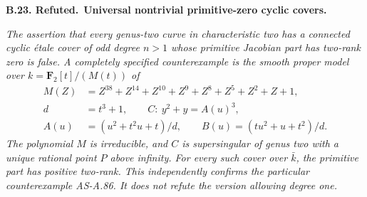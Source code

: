 \documentclass[11pt,a4paper]{article}
\newenvironment{claim}[3]{\par\medskip\noindent\hypertarget{#1}{\textbf{#1. #2.}}\ \textbf{#3.}\par\nopagebreak\smallskip\begingroup\itshape}{\endgroup\par\smallskip}
\begin{document}
\begin{claim}{B.23}{Refuted}{Universal nontrivial primitive-zero cyclic covers}
The assertion that every genus-two curve in characteristic two has
a connected cyclic \emph{\'etale} cover of odd degree $n>1$ whose
primitive Jacobian part has two-rank zero is false. A completely
specified counterexample is the smooth proper model over
$k=\mathbf F_2[t]/(M(t))$ of
\[
\begin{split}
 M(Z)&=Z^{38}+Z^{14}+Z^{10}+Z^9+Z^8+Z^5+Z^2+Z+1,\\
 d&=t^3+1,\qquad
 C:\ y^2+y=A(u)^3,\\
 A(u)&=(u^2+t^2u+t)/d,\qquad
 B(u)=(tu^2+u+t^2)/d .
\end{split}
\]
The polynomial $M$ is irreducible, and $C$ is supersingular of
genus two with a unique rational point $P$ above infinity.
For every such cover over $\bar k$, the primitive part has positive
two-rank. This independently confirms the particular counterexample
AS-A.86. It does not refute the version allowing degree one.
\end{claim}
\end{document}
